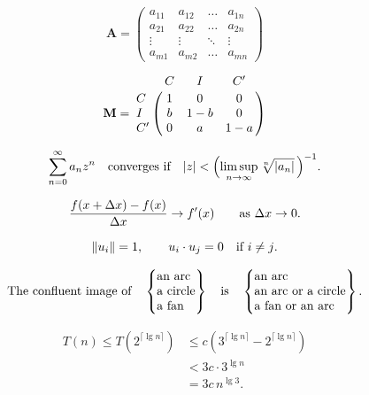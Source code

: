 \documentclass[11pt, a4paper, oneside]{article}
\newcommand{\mathup}[1]{\mathrm{#1}}
\theoremstyle{Plain}
\theoremstyle{Definition}
\theoremstyle{Remark}
\begin{document}
\begin{appendix}

	$$\mathbf{A} = \begin{pmatrix}a_{11}&a_{12}&\ldots&a_{1n}\\
	a_{21}&a_{22}&\ldots&a_{2n}\\
	\vdots&\vdots&\ddots&\vdots\\
	a_{m1}&a_{m2}&\ldots&a_{mn}\end{pmatrix}$$

	$$\mathbf{M}=\bordermatrix{&C&I&C'\cr
		C&1&0&0\cr I&b&1-b&0\cr C'&0&a&1-a}$$


	$$\sum_{n=0}^\infty a_nz^n\quad\hbox{converges if}\quad
	|z|<\Bigl(\limsup_{n\to\infty}\root n\of{|a_n|}\,\Bigr)^{-1}.$$

	$$\frac{f(x+\mathup{\Delta} x)-f(x)}{\mathup{\Delta} x}\to f'(x)
	\qquad \hbox{as $\mathup{\Delta} x\to0$.}$$

	$$\|u_i\|=1,\qquad u_i\cdot u_j=0\quad\hbox{if $i\ne j$.}$$


	$$\hbox{The confluent image of}\quad
	\begin{Bmatrix}\hbox{an arc}\hfill\\%
	\hbox{a circle}\hfill\\%
	\hbox{a fan}\hfill\end{Bmatrix}
	\quad\hbox{is}\quad
	\begin{Bmatrix}\hbox{an arc}\hfill\\%
	\hbox{an arc or a circle}\hfill\\%
	\hbox{a fan or an arc}\hfill\end{Bmatrix}.$$


	\begin{align*}
	T(n)\le T(2^{\lceil\lg n\rceil})
	&\le c(3^{\lceil\lg n\rceil}-2^{\lceil\lg n\rceil})\\
	&<3c\cdot3^{\lg n}\\
	&=3c\,n^{\lg3}.
	\end{align*}



\end{appendix}
\end{document}
